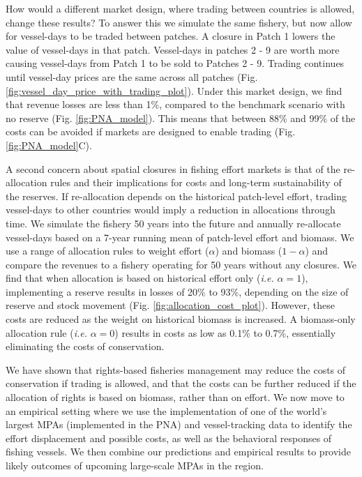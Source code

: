 \documentclass[12pt]{article}
\begin{document}
How would a different market design, where trading between countries is allowed, change these results? To answer this we simulate the same fishery, but now allow for vessel-days to be traded between patches. A closure in Patch 1 lowers the value of vessel-days in that patch. Vessel-days in patches 2 - 9 are worth more causing vessel-days from Patch 1 to be sold to Patches 2 - 9. Trading continues until vessel-day prices are the same across all patches (Fig. \ref{fig:vessel_day_price_with_trading_plot}). Under this market design, we find that revenue losses are less than 1\%, compared to the benchmark scenario with no reserve (Fig. \ref{fig:PNA_model}). This means that between 88\% and 99\% of the costs can be avoided if markets are designed to enable trading (Fig. \ref{fig:PNA_model}C).

A second concern about spatial closures in fishing effort markets is that of the re-allocation rules and their implications for costs and long-term sustainability of the reserves. If re-allocation depends on the historical patch-level effort, trading vessel-days to other countries would imply a reduction in allocations through time. We simulate the fishery 50 years into the future and annually re-allocate vessel-days based on a 7-year running mean of patch-level effort and biomass. We use a range of allocation rules to weight effort ($\alpha$) and biomass ($1 - \alpha$) and compare the revenues to a fishery operating for 50 years without any closures. We find that when allocation is based on historical effort only (\emph{i.e.} $\alpha = 1$), implementing a reserve results in losses of 20\% to 93\%, depending on the size of reserve and stock movement (Fig. \ref{fig:allocation_cost_plot}). However, these costs are reduced as the weight on historical biomass is increased. A biomass-only allocation rule (\emph{i.e.} $\alpha = 0$) results in costs as low as 0.1\% to 0.7\%, essentially eliminating the costs of conservation.

We have shown that rights-based fisheries management may reduce the costs of conservation if trading is allowed, and that the costs can be further reduced if the allocation of rights is based on biomass, rather than on effort. We now move to an empirical setting where we use the implementation of one of the world's largest MPAs (implemented in the PNA) and vessel-tracking data to identify the effort displacement and possible costs, as well as the behavioral responses of fishing vessels. We then combine our predictions and empirical results to provide likely outcomes of upcoming large-scale MPAs in the region.
\end{document}
